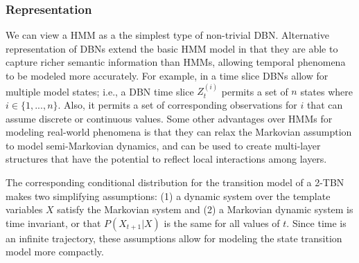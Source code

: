 \subsubsection{Representation}
      We can view a HMM as a the simplest type of non-trivial DBN.  Alternative representation of DBNs extend the basic HMM model in that they are able to capture richer semantic information than HMMs, allowing temporal phenomena to be modeled more accurately.  For example, in a time slice DBNs allow for multiple model states; i.e., a DBN time slice $Z_{t}^{(i)}$ permits a set of $n$ states where $i \in \{1,...,n\}$.  Also, it permits a set of corresponding observations for $i$ that can assume discrete or continuous values.  Some other advantages over HMMs for modeling real-world phenomena is that they can relax the Markovian assumption to model semi-Markovian dynamics, and can be used to create multi-layer structures that have the potential to reflect local interactions among layers.

      The corresponding conditional distribution for the transition model of a 2-TBN makes two simplifying assumptions: (1) a dynamic system over the template variables $X$ satisfy the Markovian system and (2) a Markovian dynamic system is time invariant, or that $P(X_{t+1}|X)$ is the same for all values of $t$.  Since time is an infinite trajectory, these assumptions allow for modeling the state transition model more compactly.

